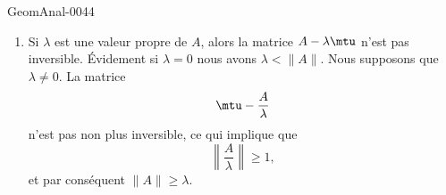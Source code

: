 \begin{corrige}{GeomAnal-0044}
\begin{enumerate}
        \item
            Si \( \lambda\) est une valeur propre de \( A\), alors la matrice \( A-\lambda\mtu\) n'est pas inversible. Évidement si \( \lambda=0\) nous avons \( \lambda<\| A \|\). Nous supposons que \( \lambda\neq 0\). La matrice
            \begin{equation}
                \mtu-\frac{ A }{ \lambda }
            \end{equation}
            n'est pas non plus inversible, ce qui implique que
            \begin{equation}
                \left\| \frac{ A }{ \lambda } \right\|\geq 1,
            \end{equation}
            et par conséquent \( \| A \|\geq \lambda\).
    \end{enumerate}

\end{corrige}

